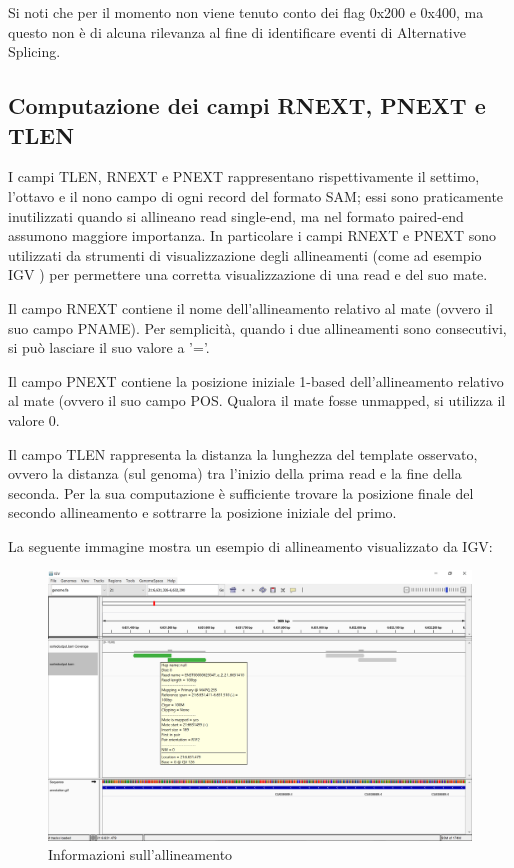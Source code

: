 Si noti che per il momento non viene tenuto conto dei flag 0x200 e 0x400, ma questo non è di alcuna rilevanza al fine di identificare eventi di Alternative Splicing.

\newpage

\subsection{Computazione dei campi RNEXT, PNEXT e TLEN}
I campi TLEN, RNEXT e PNEXT rappresentano rispettivamente il settimo, l'ottavo e il nono campo di ogni record del formato SAM; essi sono praticamente inutilizzati quando si allineano read single-end, ma nel formato paired-end assumono maggiore importanza. In particolare i campi RNEXT e PNEXT sono utilizzati da strumenti di visualizzazione degli allineamenti (come ad esempio IGV \cite{IGV}) per permettere una corretta visualizzazione di una read e del suo mate.

Il campo RNEXT contiene il nome dell'allineamento relativo al mate (ovvero il suo campo PNAME). Per semplicità, quando i due allineamenti sono consecutivi, si può lasciare il suo valore a '='.

Il campo PNEXT contiene la posizione iniziale 1-based dell'allineamento relativo al mate (ovvero il suo campo POS. Qualora il mate fosse unmapped, si utilizza il valore 0.

Il campo TLEN rappresenta la distanza la lunghezza del template osservato, ovvero la distanza (sul genoma) tra l'inizio della prima read e la fine della seconda. Per la sua computazione è sufficiente trovare la posizione finale del secondo allineamento e sottrarre la posizione iniziale del primo.

La seguente immagine mostra un esempio di allineamento visualizzato da IGV:

\begin{figure}[h]
	\centering
	\includegraphics[width=\linewidth]{images/mateinfo.png}
  \caption{Informazioni sull'allineamento}
  \label{fig:MateInfo}
\end{figure}

